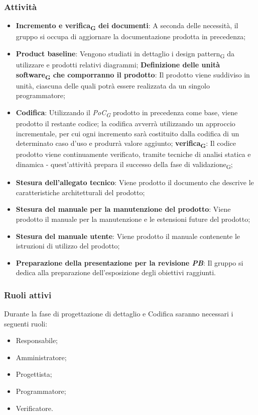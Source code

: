\subsubsection{Attività}\:
\begin{itemize}
    \item \textbf{Incremento e verifica\textsubscript{G} dei documenti}: A seconda delle necessità, il gruppo si occupa di aggiornare la documentazione prodotta in precedenza;
    \item \textbf{Product baseline}: Vengono studiati in dettaglio i design pattern\textsubscript{G} da utilizzare e prodotti relativi diagrammi;
        \subitem \textbf{Definizione delle unità software\textsubscript{G} che comporranno il prodotto}: Il prodotto viene suddiviso in unità, ciascuna delle quali potrà essere realizzata da un singolo programmatore;
    \item \textbf{Codifica}: Utilizzando il \textit{PoC\textsubscript{G}} prodotto in precedenza come base, viene prodotto il restante codice; la codifica avverrà utilizzando un approccio incrementale, per cui ogni incremento sarà costituito dalla codifica di un determinato caso d’uso e produrrà valore aggiunto;
        \subitem \textbf{verifica\textsubscript{G}}: Il codice prodotto viene continuamente verificato, tramite tecniche di analisi statica e dinamica - quest’attività prepara il successo della fase di validazione\textsubscript{G};
    \item \textbf{Stesura dell’allegato tecnico}: Viene prodotto il documento che descrive le caratteristiche architetturali del prodotto;
    \item \textbf{Stesura del manuale per la manutenzione del prodotto}: Viene prodotto il manuale per la manutenzione e le estensioni future del prodotto;
    \item \textbf{Stesura del manuale utente}: Viene prodotto il manuale contenente le istruzioni di utilizzo del prodotto;
    \item \textbf{Preparazione della presentazione per la revisione \textit{PB}}: Il gruppo si dedica alla preparazione dell’esposizione degli obiettivi raggiunti.
\end{itemize}

\subsubsection{Ruoli attivi}
Durante la fase di progettazione di dettaglio e Codifica saranno necessari i seguenti ruoli:
\begin{itemize}
	\item Responsabile;
    \item Amministratore;
    \item Progettista;
    \item Programmatore;
    \item Verificatore.
\end{itemize}

